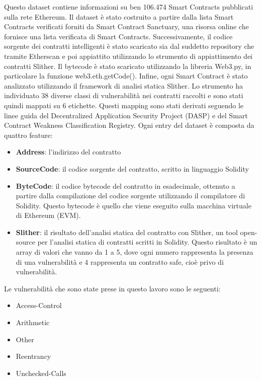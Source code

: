 \documentclass[../../Thesis.tex]{subfiles}
\begin{document}
Questo dataset contiene informazioni su ben 106.474 Smart Contracts pubblicati sulla rete Ethereum. Il dataset è stato costruito a partire dalla lista Smart Contracts verificati forniti da Smart Contract Sanctuary, una risorsa online che fornisce una lista verificata di Smart Contracts. Successivamente, il codice sorgente dei contratti intelligenti è stato scaricato sia dal suddetto repository che tramite Etherscan e poi appiattito utilizzando lo strumento di appiattimento dei contratti Slither. Il bytecode è stato scaricato utilizzando la libreria Web3.py, in particolare la funzione web3.eth.getCode(). Infine, ogni Smart Contract è stato analizzato utilizzando il framework di analisi statica Slither. Lo strumento ha individuato 38 diverse classi di vulnerabilità nei contratti raccolti e sono stati quindi mappati su 6 etichette. Questi mapping sono stati derivati seguendo le linee guida del Decentralized Application Security Project (DASP) e del Smart Contract Weakness Classification Registry. Ogni entry del dataset è composta da quattro feature:
\begin{itemize}
    \item  \textbf{Address}: l'indirizzo del contratto
    \item  \textbf{SourceCode}: il codice sorgente del contratto, scritto in linguaggio Solidity
    \item  \textbf{ByteCode}: il codice bytecode del contratto in esadecimale, ottenuto a partire dalla compilazione del codice sorgente utilizzando il compilatore di Solidity. Questo bytecode è quello che viene eseguito sulla macchina virtuale di Ethereum (EVM).
    \item  \textbf{Slither}: il risultato dell'analisi statica del contratto con Slither, un tool open-source per l'analisi statica di contratti scritti in Solidity. Questo risultato è un array di valori che vanno da 1 a 5, dove ogni numero  rappresenta la presenza di una vulnerabilità e 4 rappresenta un contratto safe, cioè privo di vulnerabilità.
\end{itemize}
Le vulnerabilità che sono state prese in questo lavoro sono le seguenti:
\begin{itemize}
    \item Access-Control
    \item Arithmetic
    \item Other
    \item Reentrancy
    \item Unchecked-Calls
\end{itemize}
 
\end{document}
